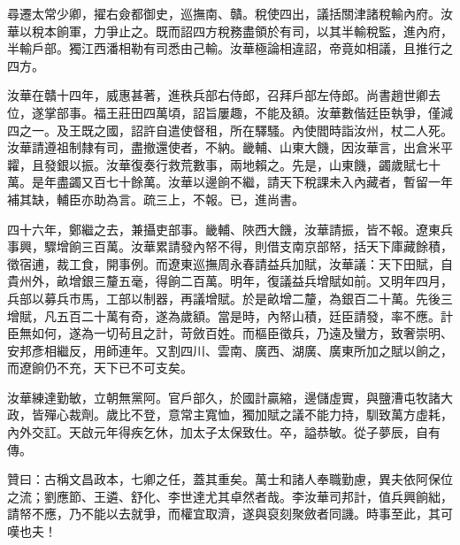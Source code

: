 \begin{pinyinscope}
尋遷太常少卿，擢右僉都御史，巡撫南、贛。稅使四出，議括關津諸稅輸內府。汝華以稅本餉軍，力爭止之。既而詔四方稅務盡領於有司，以其半輸稅監，進內府，半輸戶部。獨江西潘相勒有司悉由己輸。汝華極論相違詔，帝竟如相議，且推行之四方。

汝華在贛十四年，威惠甚著，進秩兵部右侍郎，召拜戶部左侍郎。尚書趙世卿去位，遂掌部事。福王莊田四萬頃，詔旨屢趣，不能及額。汝華數偕廷臣執爭，僅減四之一。及王既之國，詔許自遣使督租，所在驛騷。內使閻時詣汝州，杖二人死。汝華請遵祖制隸有司，盡撤還使者，不納。畿輔、山東大饑，因汝華言，出倉米平糶，且發銀以振。汝華復奏行救荒數事，兩地賴之。先是，山東饑，蠲歲賦七十萬。是年盡蠲又百七十餘萬。汝華以邊餉不繼，請天下稅課未入內藏者，暫留一年補其缺，輔臣亦助為言。疏三上，不報。已，進尚書。

四十六年，鄭繼之去，兼攝吏部事。畿輔、陜西大饑，汝華請振，皆不報。遼東兵事興，驟增餉三百萬。汝華累請發內帑不得，則借支南京部帑，括天下庫藏餘積，徵宿逋，裁工食，開事例。而遼東巡撫周永春請益兵加賦，汝華議：天下田賦，自貴州外，畝增銀三釐五毫，得餉二百萬。明年，復議益兵增賦如前。又明年四月，兵部以募兵市馬，工部以制器，再議增賦。於是畝增二釐，為銀百二十萬。先後三增賦，凡五百二十萬有奇，遂為歲額。當是時，內帑山積，廷臣請發，率不應。計臣無如何，遂為一切茍且之計，苛斂百姓。而樞臣徵兵，乃遠及蠻方，致奢崇明、安邦彥相繼反，用師連年。又割四川、雲南、廣西、湖廣、廣東所加之賦以餉之，而遼餉仍不充，天下已不可支矣。

汝華練達勤敏，立朝無黨阿。官戶部久，於國計贏縮，邊儲虛實，與鹽漕屯牧諸大政，皆殫心裁劑。歲比不登，意常主寬恤，獨加賦之議不能力持，馴致萬方虛耗，內外交訌。天啟元年得疾乞休，加太子太保致仕。卒，謚恭敏。從子夢辰，自有傳。

贊曰：古稱文昌政本，七卿之任，蓋其重矣。萬士和諸人奉職勤慮，異夫依阿保位之流；劉應節、王遴、舒化、李世達尤其卓然者哉。李汝華司邦計，值兵興餉絀，請帑不應，乃不能以去就爭，而權宜取濟，遂與裒刻聚斂者同譏。時事至此，其可嘆也夫！


\end{pinyinscope}
